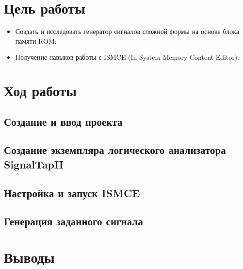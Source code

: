 





\tableofcontents
\newpage

\section{Цель работы}

\begin{itemize}
	\item Создать и исследовать генератор сигналов сложной формы на основе блока памяти ROM;
	\item Получение навыков работы с ISMCE (In-System Memory Content Editor).
\end{itemize}

\section{Ход работы}

\subsection{Создание и ввод проекта}

\subsection{Создание экземпляра логического анализатора SignalTapII}

\subsection{Настройка и запуск ISMCE}

\subsection{Генерация заданного сигнала}

\section{Выводы}


